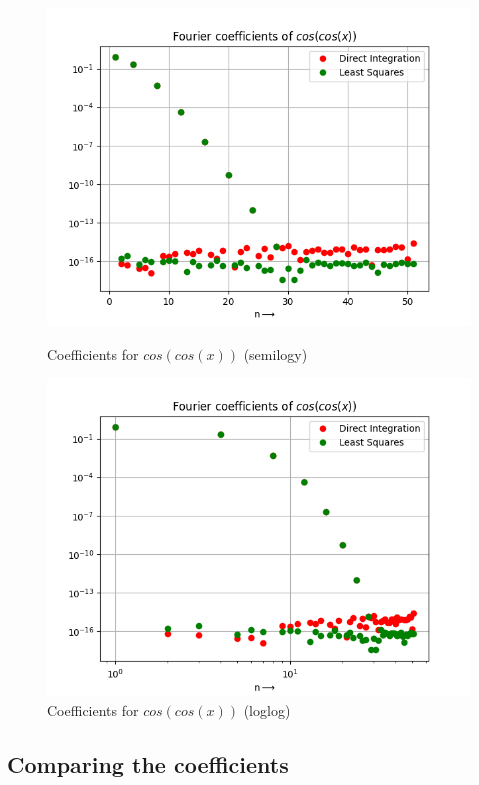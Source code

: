 \documentclass[12pt, a4paper]{article}
\begin{document}
\begin{figure}[H]
\centering
\includegraphics[scale=0.75]{Figure_5.png}
\caption{Coefficients for $cos(cos(x))$ (semilogy)}
\centering
\includegraphics[scale=0.75]{Figure_6.png}
\caption{Coefficients for $cos(cos(x))$ (loglog)}
\end{figure}

\subsection{Comparing the coefficients}
\end{document}
